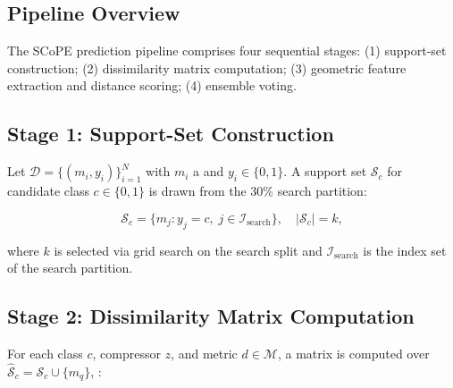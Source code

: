 \subsection{Pipeline Overview}\label{subsec:pipeline}

The SCoPE prediction pipeline comprises four sequential stages:
(1) support-set construction; (2) dissimilarity matrix computation;
(3) geometric feature extraction and distance scoring;
(4) ensemble voting.

\subsection{Stage 1: Support-Set Construction}\label{subsec:stage1}

Let $\mathcal{D} = \{(m_i, y_i)\}_{i=1}^{N}$ with $m_i$ a
 and
$y_i \in \{0,1\}$. A support set
$\mathcal{S}_c$ for candidate class $c \in \{0,1\}$ is drawn from
the 30\% search partition:

\begin{equation}
  \mathcal{S}_c = \bigl\{m_j : y_j = c,\;
                 j \in \mathcal{I}_{\mathrm{search}}\bigr\},
  \quad |\mathcal{S}_c| = k,
  \label{eq:support}
\end{equation}

\noindent where $k$ is selected via grid search on the search split
and $\mathcal{I}_{\mathrm{search}}$ is the index set of the search
partition. 

\subsection{Stage 2: Dissimilarity Matrix Computation}\label{subsec:stage2}

For each class $c$, compressor $z$, and metric
$d \in \mathcal{M}$, a matrix
 is
computed over $\hat{\mathcal{S}}_c = \mathcal{S}_c \cup \{m_q\}$,
:

